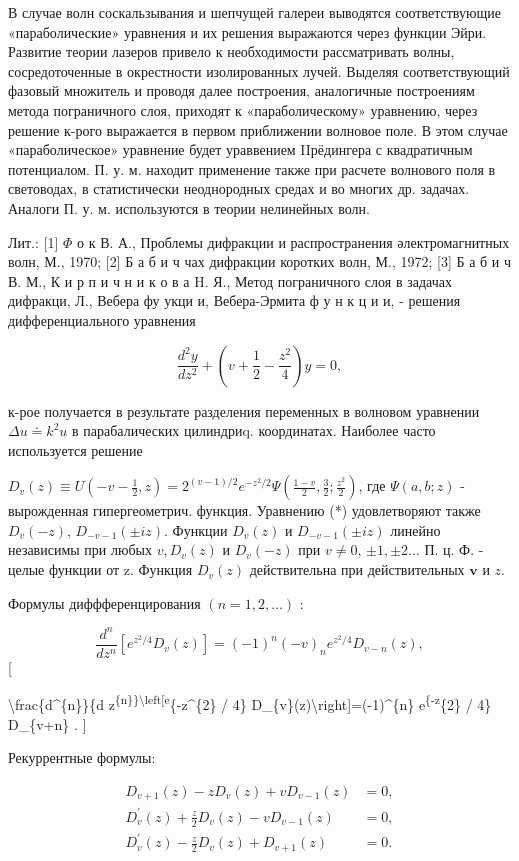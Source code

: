 \documentclass[10pt]{article}
\begin{document}
В случае волн соскальзывания и шепчущей галереи выводятся соответствующие «параболические» уравнения и их решения выражаются через функции Эйри. Развитие теории лазеров привело к необходимости рассматривать волны, сосредоточенные в окрестности изолированных лучей. Выделяя соответствующий фазовый множитель и проводя далее построения, аналогичные построениям метода пограничного слоя, приходят к «параболическому» уравнению, через решение к-рого выражается в первом приближении волновое поле. В этом случае «параболическое» уравнение будет ураввением IIрёдингера с квадратичным потенциалом. П. у. м. находит применение также при расчете волнового поля в световодах, в статистически неоднородных средах и во многих др. задачах. Аналоги П. у. м. используются в теории нелинейных волн.

Лит.: [1] $\Phi$ о к В. А., Проблемы дифракции и распространения әлектромагнитных волн, М., 1970; [2] Б а б и ч чах дифракции коротких волн, М., 1972; [3] Б а б и ч В. М., К и р п и ч н и к о в а H. Я., Метод пограничного слоя в задачах дифракци, Л., Вебера фу укци и, Вебера-Эрмита ф у н к ц и и, - решения дифференциального уравнения

\[
\frac{d^{2} y}{d z^{2}}+\left(v+\frac{1}{2}-\frac{z^{2}}{4}\right) y=0,
\]

к-рое получается в результате разделения переменных в волновом уравнении $\Delta u \doteq k^{2} u$ в парабалических цилиндриq. координатах. Наиболее часто используется решение

$D_{v}(z) \equiv U\left(-v-\frac{1}{2}, z\right)=2^{(v-1) / 2} e^{-z^{2} / 2} \Psi\left(\frac{1-v}{2}, \frac{3}{2} ; \frac{z^{2}}{2}\right)$, где $\Psi(a, b ; z)$ - вырожденная гипергеометрич. функция. Уравнению (*) удовлетворяют также $D_{v}(-z)$, $D_{-v-1}( \pm i z)$. Функции $D_{v}(z)$ и $D_{-v-1}( \pm i z)$ линейно независимы при любых $v, D_{v}(z)$ и $D_{v}(-z)$ при $v \neq 0$, $\pm 1, \pm 2 \ldots$ П. ц. Ф. - целые функции от z. Функция $D_{v}(z)$ действительна при действительных $\boldsymbol{v}$ и $z$.

Формулы диффференцирования $(n=1,2, \ldots)$ :

\[
\frac{d^{n}}{d z^{n}}\left[e^{z^{2} / 4} D_{v}(z)\right]=(-1)^{n}(-v)_{n} e^{z^{2} / 4} D_{v-n}(z),
\][

\textbackslash frac\{d\^{}\{n\}\}\{d z\textsuperscript{\{n\}\}\textbackslash left[e}\{-z\^{}\{2\} / 4\} D\_\{v\}(z)\textbackslash right]=(-1)\^{}\{n\} e\textsuperscript{\{-z}\{2\} / 4\} D\_\{v+n\} .
]

Рекуррентные формулы:

\[
\begin{aligned}
D_{v+1}(z)-z D_{v}(z)+v D_{v-1}(z) & =0, \\
D_{v}^{\prime}(z)+\frac{z}{2} D_{v}(z)-v D_{v-1}(z) & =0, \\
D_{v}^{\prime}(z)-\frac{z}{2} D_{v}(z)+D_{v+1}(z) & =0 .
\end{aligned}
\]
\end{document}
